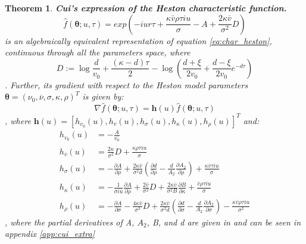 \documentclass[12,twoside]{mammeTFM}
\newtheorem{thm}{Theorem}[section]
\theoremstyle{definition}
\theoremstyle{remark}
\begin{document}
\begin{thm}\label{theorem:cui} \textbf{Cui's expression of the Heston characteristic function.}
\begin{equation} \label{eq:char_cui}
\hat{f}(\boldsymbol{\theta}; u, \tau) = exp \left(-i u r \tau + \dfrac{\kappa \bar{v} \rho \tau i u}{\sigma}-A + \dfrac{2 \kappa \bar{v}}{\sigma^{2}}D \right)
\end{equation}
is an algebraically equivalent representation of equation \ref{eq:char_heston}, continuous through all the parameters space, where
\begin{equation}
D := \log \frac{d}{v_{0}}+\frac{(\kappa-d) \tau}{2}-\log \left(\frac{d+\xi}{2 v_{0}}+\frac{d-\xi}{2 v_{0}} e^{-d \tau}\right)
\end{equation}
. Further, its gradient with respect to the Heston model parameters $\boldsymbol{\theta} = (\nu_0, \overline{\nu}, \sigma, \kappa, \rho)^{T}$ is given by:
\begin{equation}
\nabla \hat{f}(\boldsymbol{\theta}; u, \tau) = \boldsymbol{h}(u) \hat{f}(\boldsymbol{\theta}; u, \tau)
\end{equation}
, where $\boldsymbol{h}(u) = [h_{v_0}(u), h_{\overline{v}}(u), h_\sigma(u), h_\kappa(u), h_\rho(u)]^T$ and:
\begin{align}
h_{v_0}(u)& =-\frac{A}{v_{0}} \\
h_{\overline{v}}(u)& =\frac{2 \kappa}{\sigma^{2}} D+\frac{\kappa \rho \tau i u}{\sigma} \\
h_{\sigma}(u)& =-\frac{\partial A}{\partial \rho}+\frac{2 \kappa \bar{v}}{\sigma^{2} d}\left(\frac{\partial d}{\partial \rho}-\frac{d}{A_{2}} \frac{\partial A_{2}}{\partial \rho}\right)+\frac{\kappa \bar{v} \tau i u}{\sigma} \\
h_{\kappa}(u)& =-\frac{1}{\sigma i u} \frac{\partial A}{\partial \rho}+\frac{2 \bar{v}}{\sigma^{2}} D+\frac{2 \kappa \bar{v}}{\sigma^{2} B} \frac{\partial B}{\partial \kappa}+\frac{\bar{v} \rho \tau i u}{\sigma} \\
h_{\rho}(u)& =-\frac{\partial A}{\partial \sigma}-\frac{4 \kappa \bar{v}}{\sigma^{3}} D+\frac{2 \kappa \bar{v}}{\sigma^{2} d}\left(\frac{\partial d}{\partial \sigma}-\frac{d}{A_{2}} \frac{\partial A_{2}}{\partial \sigma}\right)-\frac{\kappa \bar{v} \rho \tau i u}{\sigma^{2}}
\end{align}
, where the partial derivatives of A, $A_2$, B, and d are given in \cite{cui17} and can be seen in appendix \ref{app:cui_extra}
\end{thm}
\end{document}

